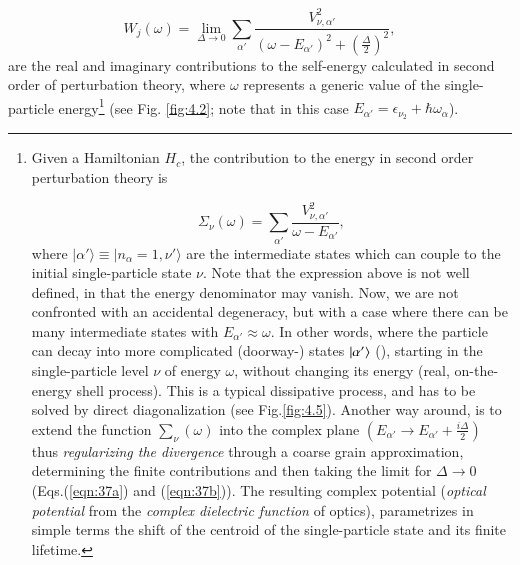 \begin{equation}
W_j(\omega)  = \lim_{\Delta \rightarrow 0} \sum_{\alpha'} \frac{V_{\nu ,\alpha'}^2}{(\omega -E_{\alpha'})^2 + (\frac{\Delta}{2})^2},
\label{eqn:37b}
\end{equation}
are the real and imaginary contributions to the self-energy calculated in second order of perturbation theory, where $\omega$ represents a generic value of the single-particle energy\footnote{Given a Hamiltonian $H_{c}$, the contribution to the energy in second order perturbation theory is

{\protect
\begin{equation}
\nonumber\Sigma_{\nu}(\omega) = \sum_{\alpha'} \frac{V_{\nu ,\alpha'}^2}{\omega - E_{\alpha'}} ,
\label{eqn:37c}
\end{equation}
}
where $|\alpha' \rangle \equiv |n_{\alpha}=1,\nu' \rangle$ are the intermediate states which can couple to the initial single-particle state $\nu$. Note that the expression above is not well defined, in that the energy denominator may vanish. Now, we are not confronted with an accidental degeneracy, but with a   case where there can be many intermediate states with $E_{\alpha'} \approx \omega$. In other words, where the particle can decay into  more complicated (doorway-) states $|{\alpha'} \rangle$  (\cite{Feshbach:58}), starting in the single-particle level $\nu$ of energy $\omega$, without changing its energy (real, on-the-energy shell process). This is a typical dissipative  process, and has to be solved by direct diagonalization (see Fig.\ref{fig:4.5}). Another way around, is to extend the function $\sum_{\nu}(\omega)$ into the complex plane $(E_{\alpha'} \rightarrow E_{\alpha'} + \frac{i\Delta}{2})$ thus {\it regularizing the divergence} through a coarse grain approximation, determining the finite contributions and then taking the limit for $\Delta \rightarrow 0$ (Eqs.(\ref{eqn:37a}) and (\ref{eqn:37b})). The resulting complex potential ({\it optical potential} from the {\it complex dielectric function} of optics), parametrizes in simple terms the shift of the centroid of the single-particle state and its finite lifetime.} (see Fig. \ref{fig:4.2}; note that in this case $E_{\alpha'}=\epsilon_{\nu_2}+\hbar\omega_\alpha$).


